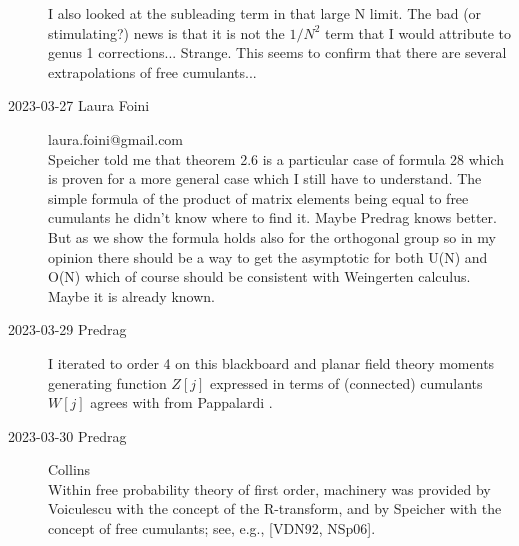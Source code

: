 \begin{description}
I also looked at the subleading term in that large N limit. The bad (or
stimulating?) news is that it is not the $1/N^2$ term that I would
attribute to genus 1 corrections... Strange. This seems to confirm that
there are several extrapolations of free cumulants...

   \item[2023-03-27 Laura Foini]  laura.foini@gmail.com\\
Speicher told me that theorem 2.6 is a particular case of formula 28
which is proven for a more general case which I still have to understand.
The simple formula of the product of matrix elements being equal to free
cumulants he didn't know where to find it.
Maybe Predrag knows better.
But as we show the formula holds also for the orthogonal group so in my
opinion there should be a way to get the asymptotic for both U(N) and
O(N) which of course should be consistent with Weingerten calculus. Maybe
it is already known.

   \item[2023-03-29 Predrag]
I iterated  to order 4 on this
 {blackboard}
and planar field theory moments generating function $Z[j]$ expressed in
terms of (connected) cumulants $W[j]$ agrees with 
from Pappalardi \etal{}.


   \item[2023-03-30 Predrag]  Collins \etal{}\\

Within free probability theory of first order, machinery was provided by
Voiculescu with the concept of the R-transform, and by Speicher with the
concept of free cumulants; see, e.g., [VDN92, NSp06].
%


\end{description}


\printbibliography[heading=subbibintoc,title={References}]
